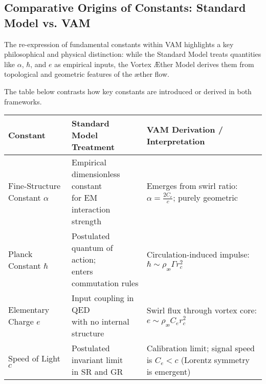 \subsection*{Comparative Origins of Constants: Standard Model vs. VAM}

The re-expression of fundamental constants within VAM highlights a key philosophical and physical distinction: while the Standard Model treats quantities like $\alpha$, $\hbar$, and $e$ as empirical inputs, the Vortex Æther Model derives them from topological and geometric features of the æther flow.

The table below contrasts how key constants are introduced or derived in both frameworks.

\begin{table}[H]
    \centering
    \footnotesize
    \renewcommand{\arraystretch}{1.3}
    \begin{tabular}{|l|l|l|}
        \hline
        \textbf{Constant} & \textbf{Standard Model Treatment} & \textbf{VAM Derivation / Interpretation} \\
        \hline
        \makecell[l]{Fine-Structure \\ Constant $\alpha$} &
        \makecell[l]{Empirical dimensionless constant \\ for EM interaction strength} &
        \makecell[l]{Emerges from swirl ratio: \\ $\alpha = \frac{2 C_e}{c}$; purely geometric} \\
        \hline

        \makecell[l]{Planck Constant \\ $\hbar$} &
        \makecell[l]{Postulated quantum of action; \\ enters commutation rules} &
        \makecell[l]{Circulation-induced impulse: \\ $\hbar \sim \rho_\text{\ae} \Gamma r_c^2$} \\
        \hline

        \makecell[l]{Elementary \\ Charge $e$} &
        \makecell[l]{Input coupling in QED \\ with no internal structure} &
        \makecell[l]{Swirl flux through vortex core: \\ $e \sim \rho_\text{\ae} C_e r_c^2$} \\
        \hline

        \makecell[l]{Speed of \\ Light $c$} &
        \makecell[l]{Postulated invariant limit \\ in SR and GR} &
        \makecell[l]{Calibration limit; \\ signal speed is $C_e < c$ \\ (Lorentz symmetry is emergent)} \\
        \hline


\end{tabular}
\end{table}
